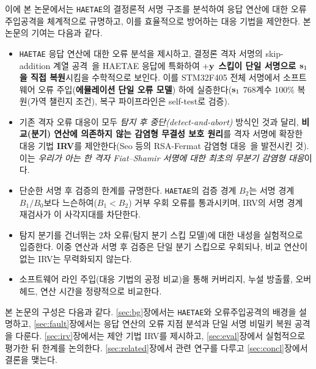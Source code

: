 이에 본 논문에서는 \texttt{HAETAE}의 결정론적 서명 구조를 분석하여 응답 연산에 대한 오류주입공격을
체계적으로 규명하고, 이를 효율적으로 방어하는 대응 기법을 제안한다. 본 논문의 기여는 다음과 같다.
\begin{itemize}
  \item \texttt{HAETAE} 응답 연산에 대한 오류 분석을 제시하고, 결정론 격자 서명의 skip-addition
        계열 공격~\cite{ravi2019determinism}을 HAETAE 응답에 특화하여 \textbf{$+\mathbf{y}$ 스킵이 단일
        서명으로 $\mathbf{s}_1$을 직접 복원}시킴을 수학적으로 보인다. 이를 STM32F405 전체 서명에서
        소프트웨어 오류 주입(\textbf{에뮬레이션 단일 오류 모델}) 하에 실증한다($\mathbf{s}_1$ 768계수 100\%
        복원(가역 챌린지 조건), 복구 파이프라인은 self-test로 검증).
  \item 기존 격자 오류 대응이 모두 \emph{탐지 후 중단(detect-and-abort)} 방식인 것과 달리,
        \textbf{비교(분기) 연산에 의존하지 않는 감염형 무결성 보호 원리}를 격자 서명에 확장한
        대응 기법 \textbf{IRV}를 제안한다(Seo 등의 RSA-Fermat 감염형 대응~\cite{seo2013}을 발전시킨 것).
        이는 \emph{우리가 아는 한 격자 Fiat--Shamir 서명에 대한 최초의 무분기 감염형 대응}이다.
  \item 단순한 서명 후 검증의 한계를 규명한다. \texttt{HAETAE}의 검증 경계 $B_2$는 서명 경계
        $B_1/B_0$보다 느슨하여($B_1<B_2$) 거부 우회 오류를 통과시키며, IRV의 서명 경계 재검사가
        이 사각지대를 차단한다.
  \item 탐지 분기를 건너뛰는 2차 오류(탐지 분기 스킵 모델)에 대한 내성을 실험적으로 입증한다. 이중
        연산과 서명 후 검증은 단일 분기 스킵으로 우회되나, 비교 연산이 없는 IRV는 무력화되지 않는다.
  \item 소프트웨어 라인 주입(대응 기법의 공정 비교)을 통해 커버리지,
        누설 방출률, 오버헤드, 연산 시간을 정량적으로 비교한다.
\end{itemize}

본 논문의 구성은 다음과 같다. \ref{sec:bg}장에서는 \texttt{HAETAE}와 오류주입공격의 배경을
설명하고, \ref{sec:fault}장에서는 응답 연산의 오류 지점 분석과 단일 서명 비밀키 복원 공격을 다룬다.
\ref{sec:irv}장에서는 제안 기법 IRV를 제시하고, \ref{sec:eval}장에서 실험적으로 평가한 뒤 한계를
논의한다. \ref{sec:related}장에서 관련 연구를 다루고 \ref{sec:concl}장에서 결론을 맺는다.
